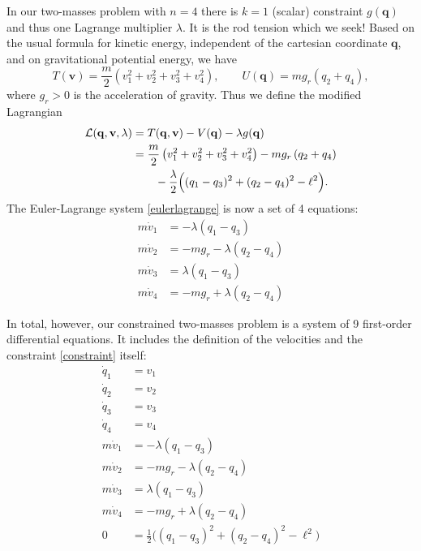 \documentclass[letterpaper,final,12pt,reqno]{amsart}
\newcommand{\bq}{\mathbf{q}}
\newcommand{\bv}{\mathbf{v}}
\begin{document}
In our two-masses problem with $n=4$ there is $k=1$ (scalar) constraint $g(\bq)$ and thus one Lagrange multiplier $\lambda$.  It is the rod tension which we seek!  Based on the usual formula for kinetic energy, independent of the cartesian coordinate $\bq$, and on gravitational potential energy, we have
\begin{equation}
T(\bv) = \frac{m}{2} \left(v_1^2+v_2^2+v_3^2+v_4^2\right), \qquad U(\bq) = m g_r \left(q_2+q_4\right), \label{energies}
\end{equation}
where $g_r>0$ is the acceleration of gravity.  Thus we define the modified Lagrangian
\begin{align}
\mathcal{L}(\bq,\bv,\lambda) &= T(\bq,\bv) - V(\bq) - \lambda g(\bq) \label{lagrangian} \\
  &= \frac{m}{2} \left(v_1^2+v_2^2+v_3^2+v_4^2\right) - m g_r \left(q_2+q_4\right) \notag \\
  &\qquad - \frac{\lambda}{2} \Big((q_1 - q_3)^2 + (q_2 - q_4)^2 - \ell^2\Big). \notag
\end{align}
The Euler-Lagrange system \eqref{eulerlagrange} is now a set of 4 equations:
\begin{align*}
m \dot v_1 &= - \lambda (q_1 - q_3) \\
m \dot v_2 &= - m g_r - \lambda (q_2 - q_4) \\
m \dot v_3 &= \lambda (q_1 - q_3) \\
m \dot v_4 &= - m g_r + \lambda (q_2 - q_4)
\end{align*}

In total, however, our constrained two-masses problem is a system of 9 first-order differential equations.  It includes the definition of the velocities and the constraint \eqref{constraint} itself:
\begin{align*}
  \dot q_1 &= v_1 \\
  \dot q_2 &= v_2 \\
  \dot q_3 &= v_3 \\
  \dot q_4 &= v_4 \\
m \dot v_1 &= - \lambda (q_1 - q_3) \\
m \dot v_2 &= - m g_r - \lambda (q_2 - q_4) \\
m \dot v_3 &= \lambda (q_1 - q_3) \\
m \dot v_4 &= - m g_r + \lambda (q_2 - q_4) \\
         0 &= \frac{1}{2} \Big((q_1 - q_3)^2 + (q_2 - q_4)^2 - \ell^2\Big)
\end{align*}
\end{document}
